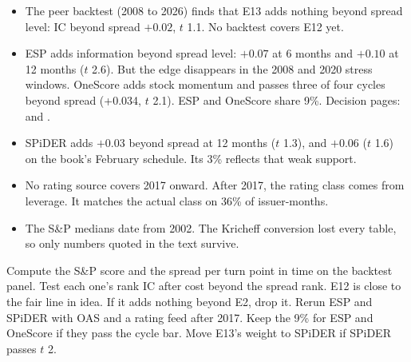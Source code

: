\begin{itemize}
\item The peer backtest (2008 to 2026) finds that E13 adds nothing beyond spread level: IC beyond spread $+0.02$, $t$ 1.1. No backtest covers E12 yet.
\item ESP adds information beyond spread level: $+0.07$ at 6 months and $+0.10$ at 12 months ($t$ 2.6). But the edge disappears in the 2008 and 2020 stress windows. OneScore adds stock momentum and passes three of four cycles beyond spread (+0.034, $t$ 2.1). ESP and OneScore share 9\%. Decision pages:  and .
\item SPiDER adds $+0.03$ beyond spread at 12 months ($t$ 1.3), and $+0.06$ ($t$ 1.6) on the book's February schedule. Its 3\% reflects that weak support.
\item No rating source covers 2017 onward. After 2017, the rating class comes from leverage. It matches the actual class on 36\% of issuer-months.
\item The S\&P medians date from 2002. The Kricheff conversion lost every table, so only numbers quoted in the text survive.
\end{itemize}

Compute the S\&P score and the spread per turn point in time on the backtest panel. Test each one's rank IC after cost beyond the spread rank. E12 is close to the fair line in idea. If it adds nothing beyond E2, drop it. Rerun ESP and SPiDER with OAS and a rating feed after 2017. Keep the 9\% for ESP and OneScore if they pass the cycle bar. Move E13's weight to SPiDER if SPiDER passes $t$ 2.
